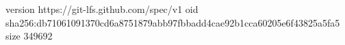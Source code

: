 version https://git-lfs.github.com/spec/v1
oid sha256:db71061091370cd6a8751879abb97fbbadd4cae92b1cca60205e6f43825a5fa5
size 349692
